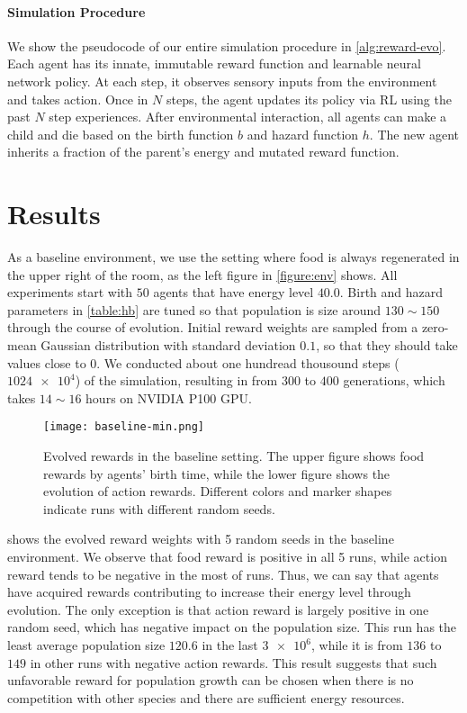 \paragraph{Simulation Procedure}
We show the pseudocode of our entire simulation procedure in \cref{alg:reward-evo}. Each agent has its innate, immutable reward function and learnable neural network policy. At each step, it observes sensory inputs from the environment and takes action. Once in $N$ steps, the agent updates its policy via RL using the past $N$ step experiences. After environmental interaction, all agents can make a child and die based on the birth function $b$ and hazard function $h$. The new agent inherits a fraction of the parent's energy and mutated reward function.

\section{Results}
As a baseline environment, we use the setting where food is always regenerated in the upper right of the room, as the left figure in \cref{figure:env} shows. All experiments start with $50$ agents that have energy level $40.0$. Birth and hazard parameters in \cref{table:hb} are tuned so that population is size around $130\sim 150$ through the course of evolution. Initial reward weights are sampled from a zero-mean Gaussian distribution with standard deviation $0.1$, so that they should take values close to $0$. We conducted about one hundread thousound steps ($\num{1024e4}$) of the simulation, resulting in from $300$ to $400$ generations, which takes $14\sim16$ hours on NVIDIA P100 GPU.

\begin{figure}[t]
  \centering
  \texttt{[image: baseline-min.png]}
  \caption{
    Evolved rewards in the baseline setting.
    The upper figure shows food rewards by agents' birth time, while the lower figure shows the evolution of action rewards.
    Different colors and marker shapes indicate runs with different random seeds.
  }\label{figure:result-baseline}
\end{figure}

 shows the evolved reward weights with 5 random seeds in the baseline environment. We observe that food reward is positive in all 5 runs, while action reward tends to be negative in the most of runs. Thus, we can say that agents have acquired rewards contributing to increase their energy level through evolution. The only exception is that action reward is largely positive in one random seed, which has negative impact on the population size. This run has the least average population size $120.6$ in the last $\num{3e6}$, while it is from $136$ to $149$ in other runs with negative action rewards. This result suggests that such unfavorable reward for population growth can be chosen when there is no competition with other species and there are sufficient energy resources.

